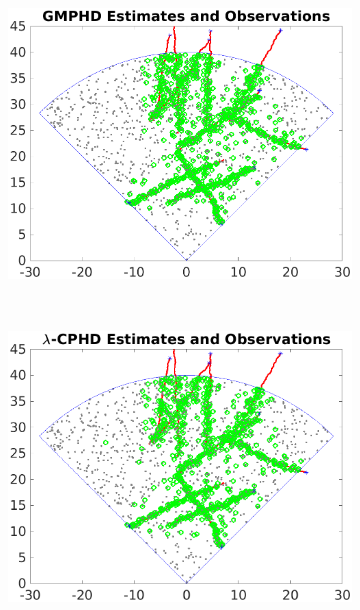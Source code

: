 \documentclass{article}
\begin{document}
\begin{figure}[h]
  \centering
  \begin{subfigure}[t]{0.32\textwidth}
    \centering
    \includegraphics[width=1\linewidth]{gmphd_tracks.png}
  \end{subfigure}%
  ~ 
  \begin{subfigure}[t]{0.32\textwidth}
    \centering
    \includegraphics[width=1\linewidth]{lcphd_tracks.png}
  \end{subfigure}
  ~
  \begin{subfigure}[t]{0.32\textwidth}
    \centering

\end{subfigure}
\end{figure}
\end{document}
